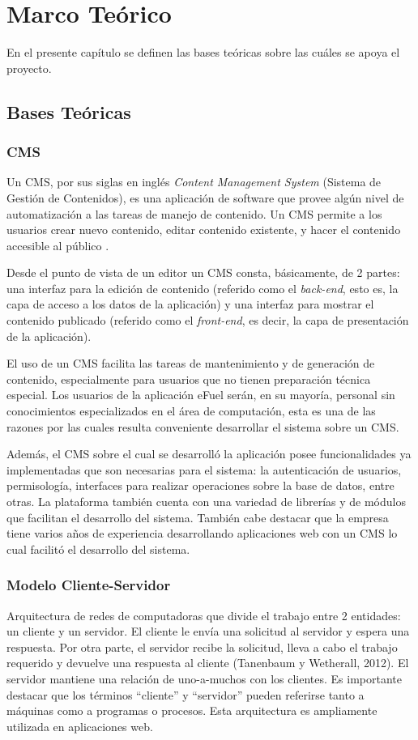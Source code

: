 \chapter{Marco Teórico}
En el presente capítulo se definen las bases teóricas sobre las cuáles se apoya el proyecto.

\section{Bases Teóricas}

\subsection{CMS}
Un CMS, por sus siglas en inglés \textit{Content Management System} (Sistema de Gestión de Contenidos), es una aplicación de software que provee algún nivel de automatización a las tareas de manejo de contenido. Un CMS permite a los usuarios crear nuevo contenido, editar contenido existente, y hacer el contenido accesible al público \cite{cmsbarker}.

Desde el punto de vista de un editor un CMS consta, básicamente, de 2 partes: una interfaz para la edición de contenido (referido como el \textit{back-end}, esto es, la capa de acceso a los datos de la aplicación) y una interfaz para mostrar el contenido publicado (referido como el \textit{front-end}, es decir, la capa de presentación de la aplicación).

El uso de un CMS facilita las tareas de mantenimiento y de generación de contenido, especialmente para usuarios que no tienen preparación técnica especial. Los usuarios de la aplicación eFuel serán, en su mayoría, personal sin conocimientos especializados en el área de computación, esta es una de las razones por las cuales resulta conveniente desarrollar el sistema sobre un CMS.

Además, el CMS sobre el cual se desarrolló la aplicación posee funcionalidades ya implementadas que son necesarias para el sistema: la autenticación de usuarios, permisología, interfaces para realizar operaciones sobre la base de datos, entre otras. La plataforma también cuenta con una variedad de librerías y de módulos que facilitan el desarrollo del sistema. También cabe destacar que la empresa tiene varios años de experiencia desarrollando aplicaciones web con un CMS lo cual facilitó el desarrollo del sistema.

\subsection{Modelo Cliente-Servidor}
Arquitectura de redes de computadoras que divide el trabajo entre 2 entidades: un cliente y un servidor. El cliente le envía una solicitud al servidor y espera una respuesta. Por otra parte, el servidor recibe la solicitud, lleva a cabo el trabajo requerido y devuelve una respuesta al cliente (Tanenbaum y Wetherall, 2012). El servidor mantiene una relación de uno-a-muchos con los clientes. Es importante destacar que los términos “cliente” y “servidor” pueden referirse tanto a máquinas como a programas o procesos. Esta arquitectura es ampliamente utilizada en aplicaciones web.

